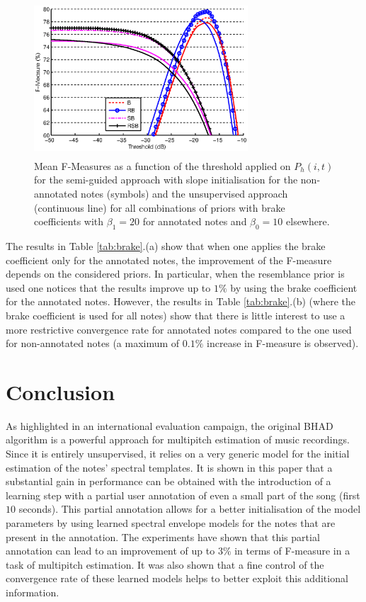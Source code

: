 \documentclass{article}
\begin{document}
\begin{figure}[!ht]
\begin{minipage}[b]{1.0\linewidth}
  \centering
  \centerline{\includegraphics[width=8cm,height=5.8cm]{figures/finalbrake.eps}}
\end{minipage}
\caption{Mean F-Measures as a function of the threshold applied on $P_h(i,t)$ for the semi-guided approach with slope initialisation for the non-annotated notes (symbols) and the unsupervised approach (continuous line) for all combinations of priors with brake coefficients with $\beta_1=20$ for annotated notes and $\beta_0=10$ elsewhere.}
\label{fig:fxt-brake}
\end{figure}


The results in Table \ref{tab:brake}.(a) show that when one applies the brake coefficient only for the annotated notes, the improvement of the F-measure depends on the considered priors. In particular, when the resemblance prior is used one notices that the results improve up to $1\%$ by using the brake coefficient for the annotated notes. However, the results in Table \ref{tab:brake}.(b) (where the brake coefficient is used for all notes) show that there is little interest to use a more restrictive convergence rate for annotated notes compared to the one used for non-annotated notes (a maximum of $0.1\%$ increase in F-measure is observed).


\section{Conclusion}
\label{sec:conc}

As highlighted in an international evaluation campaign, the original BHAD algorithm is a powerful approach for multipitch estimation of music recordings. Since it is entirely unsupervised, it relies on a very generic model for the initial estimation of the notes' spectral templates.
It is shown in this paper that a substantial gain in performance can be obtained with the introduction of a learning step with a partial user annotation of even a small part of the song (first $ 10$ seconds). This partial annotation allows for a better initialisation of the model parameters by using learned spectral envelope models for the notes that are present in the annotation. The experiments have shown that this partial annotation can lead to an improvement of up to $3\%$ in terms of F-measure in a task of multipitch estimation. It was also shown that a fine control of the convergence rate of these learned models helps to better exploit this additional information.
\end{document}
